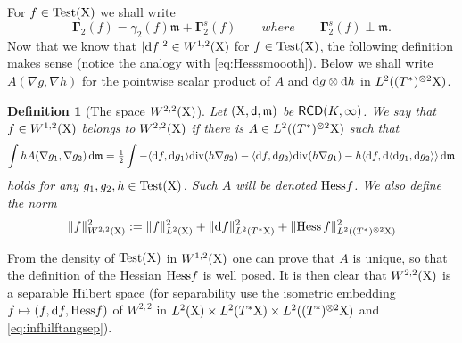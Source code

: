 \documentclass[11pt]{article}
\numberwithin{equation}{section}
\newtheorem{definition}[theorem]{Definition}
\newcommand{\X}{{\rm X}}
\newcommand{\sfd}{{\sf d}}
\newcommand{\mm}{{\mathfrak m}}
\newcommand{\RCD}{{\sf RCD}}
\renewcommand{\d}{{\rm d}}
\renewcommand{\div}{{\rm div}}
\newcommand\la{\langle}
\newcommand\ra{\rangle}
\newcommand{\test}{{\rm Test}}
\newcommand{\Ggamma}{{\mathbf \Gamma}}
\begin{document}
For $f\in\test(\X)$ we shall write
\[
\Ggamma_2(f)=\gamma_2(f)\mm+\Ggamma_2^s(f)\qquad{ where }\qquad\Ggamma_2^s(f)\perp\mm.
\]
Now that we know that $|\d f|^2\in W^{1,2}(\X)$ for $f\in\test(\X)$, the following definition makes sense (notice the analogy with \eqref{eq:Hesssmoooth}). Below we shall write $A(\nabla g,\nabla h)$ for the pointwise scalar product of $ A$ and $\d g\otimes \d h$ in $L^2((T^*)^{\otimes 2}\X)$.
\begin{definition}[The space $W^{2,2}(\X)$]\label{def:w22} Let $(\X,\sfd,\mm)$ be $\RCD(K,\infty)$. We say that $f\in W^{1,2}(\X)$ belongs to $W^{2,2}(\X)$ if there is $A\in L^2((T^*)^{\otimes 2}\X)$ such that
\[
\int hA(\nabla g_1,\nabla g_2)\,\d\mm=\tfrac12\int-\la\d f,\d g_1\ra\div(h\nabla g_2)-\la\d f,\d g_2\ra\div(h\nabla g_1)-h\la\d f,\d\la\d g_1,\d g_2\ra\ra\,\d\mm
\]
holds for any $g_1,g_2,h\in\test(\X)$. Such $A$ will be denoted ${\rm Hess}f$. We also define the norm
\[
\|f\|_{W^{2,2}(\X)}^2:=\|f\|_{L^2(\X)}^2+\|\d f\|_{L^2(T^*\X)}^2+\|{\rm Hess}\,f\|_{L^2((T^*)^{\otimes 2}\X)}^2
\] 
\end{definition}
From the density of $\test(\X)$ in $W^{1,2}(\X)$ one can prove that $A$ is unique, so that the definition of the Hessian ${\rm Hess}f$ is well posed. It is then clear that $W^{2,2}(\X)$ is a separable Hilbert space (for separability use the isometric embedding $f\mapsto (f,\d f,{\rm Hess}f)$ of $W^{2,2}$ in $L^2(\X)\times L^2(T^*\X)\times L^2((T^*)^{\otimes 2}\X)$ and \eqref{eq:infhilftangsep}).
\end{document}
